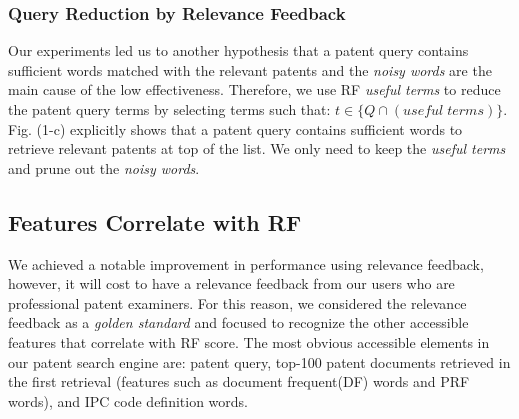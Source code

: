 \documentclass{sig-alternate}
\begin{document}
\subsubsection{Query Reduction by Relevance Feedback}
Our experiments led us to another hypothesis that a patent query contains sufficient words matched with the relevant patents and the {\em noisy words} are the main cause of the low effectiveness. Therefore, we use RF {\em useful terms} to reduce the patent query terms by selecting terms such that: $ t \in \{ Q\cap (useful \; terms)\} $. Fig. (1-c) explicitly shows that a patent query contains sufficient words to retrieve relevant patents at top of the list. We only need to keep the {\em useful terms} and prune out the {\em noisy words}.

\subsection{Features Correlate with RF}
We achieved a notable improvement in performance using relevance feedback, however, it will cost to have a relevance feedback from our users who are professional patent examiners. For this reason, we considered the relevance feedback as a {\em golden standard} and focused to recognize the other accessible features that correlate with RF score. The most obvious accessible elements in our patent search engine are: patent query, top-100 patent documents retrieved in the first retrieval (features such as document frequent(DF) words and PRF words), and IPC code definition words.  
\end{document}
